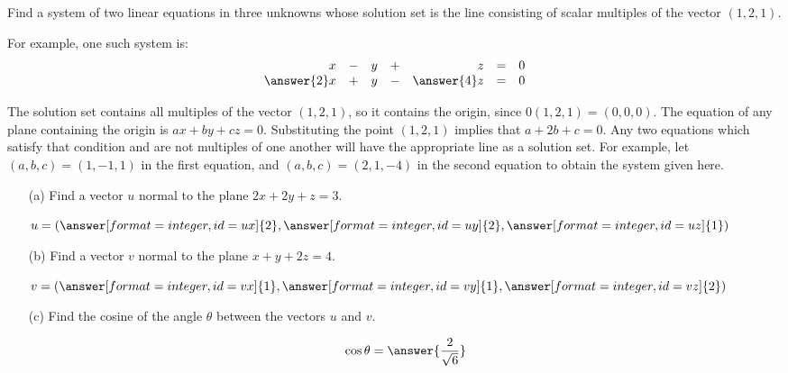 \documentclass{ximera}
\begin{document}
\begin{exercise} \label{c2.2.8}
Find a system of two linear equations in three
unknowns whose solution set is the line consisting of scalar
multiples of the vector $(1,2,1)$.

\begin{prompt}
  For example, one such system is:
\[
\begin{array}{rrrrrrr}
x & - & y & + & z & = & 0 \\
\answer{2}x & + & y & - & \answer{4}z & = & 0\end{array}
\]
\end{prompt}
\begin{hint}
  The solution set contains all multiples of the vector $(1,2,1)$,
so it contains the origin, since $0(1,2,1) = (0,0,0)$.  The equation
of any plane containing the origin is $ax + by + cz = 0$. 
Substituting the point $(1,2,1)$ implies that $a + 2b + c = 0$. 
Any two equations which satisfy that condition and are not multiples
of one another will have the appropriate line as a solution set. 
For example, let $(a,b,c) = (1,-1,1)$ in the first equation, and
$(a,b,c) = (2,1,-4)$ in the second equation to obtain the system
given here.
\end{hint}
\end{exercise}

\begin{exercise} \label{c2.2.9}
\begin{itemize}
\item[(a)] Find a vector $u$ normal to the plane $2x+2y+z=3$.
  \begin{prompt}
    \begin{validator}[(ux==uy) && (uy==2*uz) && (uy != 0)]
      \(
        u = \left( \answer[format=integer,id=ux]{2}, \answer[format=integer,id=uy]{2}, \answer[format=integer,id=uz]{1} \right)
      \)
    \end{validator}
  \end{prompt}
\item[(b)] Find a vector $v$ normal to the plane $x+y+2z=4$.
  \begin{prompt}
    \begin{validator}[(vx==vy) && (2*vy==vz) && (vy != 0)]
      \(
        v = \left( \answer[format=integer,id=vx]{1}, \answer[format=integer,id=vy]{1}, \answer[format=integer,id=vz]{2} \right)
      \)
    \end{validator}
  \end{prompt}
\item[(c)] Find the cosine of the angle $\theta$ between the vectors $u$ and $v$.
  \begin{prompt}
    \[
      \cos \theta = \answer{\frac{2}{\sqrt{6}}}
    \]
  \end{prompt}
\end{itemize}
\end{exercise}
\end{document}
